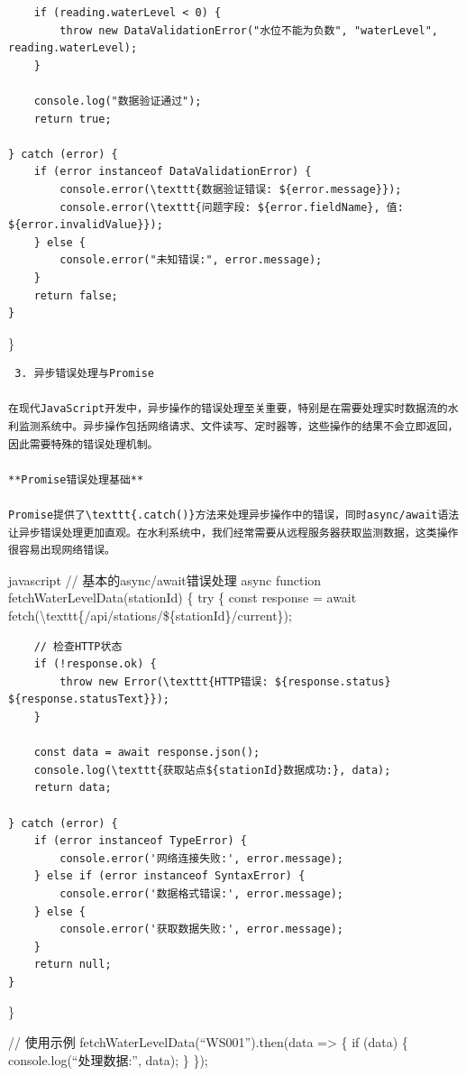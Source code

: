 {\begin{verbatim}
    if (reading.waterLevel < 0) {
        throw new DataValidationError("水位不能为负数", "waterLevel", reading.waterLevel);
    }
    
    console.log("数据验证通过");
    return true;
    
} catch (error) {
    if (error instanceof DataValidationError) {
        console.error(\texttt{数据验证错误: ${error.message}});
        console.error(\texttt{问题字段: ${error.fieldName}, 值: ${error.invalidValue}});
    } else {
        console.error("未知错误:", error.message);
    }
    return false;
}
\end{verbatim}

\}

\begin{lstlisting}
 3. 异步错误处理与Promise

在现代JavaScript开发中，异步操作的错误处理至关重要，特别是在需要处理实时数据流的水利监测系统中。异步操作包括网络请求、文件读写、定时器等，这些操作的结果不会立即返回，因此需要特殊的错误处理机制。

**Promise错误处理基础**

Promise提供了\texttt{.catch()}方法来处理异步操作中的错误，同时async/await语法让异步错误处理更加直观。在水利系统中，我们经常需要从远程服务器获取监测数据，这类操作很容易出现网络错误。
\end{lstlisting}

javascript // 基本的async/await错误处理 async function fetchWaterLevelData(stationId) \{ try \{ const response = await fetch(\textbackslash texttt\{/api/stations/\$\{stationId\}/current\});

\begin{verbatim}
    // 检查HTTP状态
    if (!response.ok) {
        throw new Error(\texttt{HTTP错误: ${response.status} ${response.statusText}});
    }
    
    const data = await response.json();
    console.log(\texttt{获取站点${stationId}数据成功:}, data);
    return data;
    
} catch (error) {
    if (error instanceof TypeError) {
        console.error('网络连接失败:', error.message);
    } else if (error instanceof SyntaxError) {
        console.error('数据格式错误:', error.message);
    } else {
        console.error('获取数据失败:', error.message);
    }
    return null;
}
\end{verbatim}

\}

// 使用示例 fetchWaterLevelData(``WS001'').then(data =\textgreater{} \{ if (data) \{ console.log(``处理数据:'', data); \} \});

}
